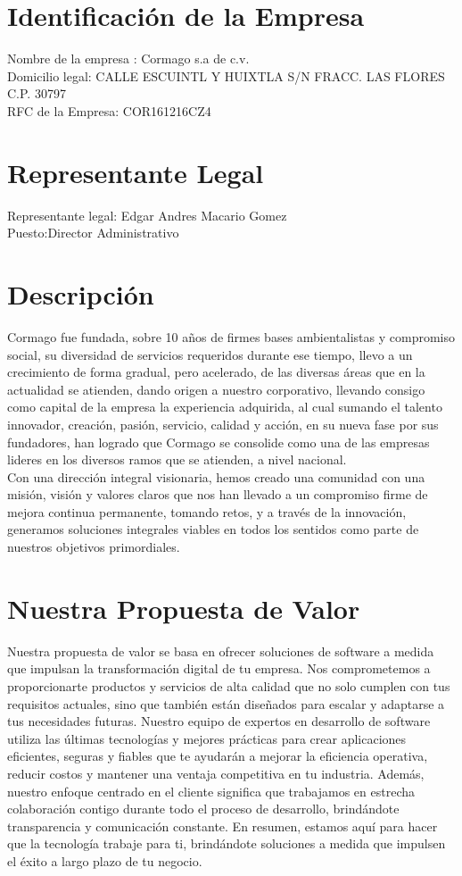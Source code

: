 \documentclass{report}
\begin{document}
		\section{Identificación de la Empresa}
		Nombre de la empresa : Cormago s.a de c.v.\\
		\break
		Domicilio legal: CALLE ESCUINTL Y HUIXTLA S/N FRACC. LAS FLORES  C.P. 30797\\
		\break
		RFC de la Empresa: COR161216CZ4
		\section{Representante Legal}
				Representante legal: Edgar Andres Macario Gomez\\
		\break
		Puesto:Director Administrativo
		\section{Descripción}
		Cormago fue fundada, sobre 10 años de firmes bases ambientalistas y compromiso social, su diversidad de servicios requeridos durante ese tiempo, llevo a un crecimiento de forma gradual, pero acelerado, de las diversas áreas que en la actualidad se atienden, dando origen a nuestro corporativo, llevando consigo como capital de la empresa la experiencia adquirida, al cual sumando el talento innovador, creación, pasión, servicio, calidad y acción, en su nueva fase por sus fundadores, han logrado que Cormago se consolide como una de las empresas lideres en los diversos ramos que se atienden, a nivel nacional.\\
		 Con una dirección integral visionaria, hemos creado una comunidad con una misión, visión y valores claros que nos han llevado a un compromiso firme de mejora continua permanente, tomando retos, y a través de la innovación, generamos soluciones integrales viables en todos los sentidos como parte de nuestros objetivos primordiales.
		\section{Nuestra Propuesta de Valor}
		Nuestra propuesta de valor se basa en ofrecer soluciones de software a medida que impulsan la transformación digital de tu empresa. Nos comprometemos a proporcionarte productos y servicios de alta calidad que no solo cumplen con tus requisitos actuales, sino que también están diseñados para escalar y adaptarse a tus necesidades futuras. Nuestro equipo de expertos en desarrollo de software utiliza las últimas tecnologías y mejores prácticas para crear aplicaciones eficientes, seguras y fiables que te ayudarán a mejorar la eficiencia operativa, reducir costos y mantener una ventaja competitiva en tu industria. Además, nuestro enfoque centrado en el cliente significa que trabajamos en estrecha colaboración contigo durante todo el proceso de desarrollo, brindándote transparencia y comunicación constante. En resumen, estamos aquí para hacer que la tecnología trabaje para ti, brindándote soluciones a medida que impulsen el éxito a largo plazo de tu negocio.
		
		
\end{document}

